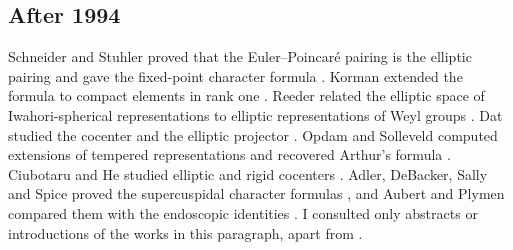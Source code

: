 \documentclass[12pt,letterpaper]{amsart}
\numberwithin{equation}{section}
\theoremstyle{definition}
\theoremstyle{remark}
\begin{document}
\subsection*{After 1994}
Schneider and Stuhler proved that the Euler--Poincar\'e pairing is the elliptic pairing and gave the fixed-point character formula \cite{SS97}. Korman extended the formula to compact elements in rank one \cite{Ko04}. Reeder related the elliptic space of Iwahori-spherical representations to elliptic representations of Weyl groups \cite{Re01}. Dat studied the cocenter and the elliptic projector \cite{Da00}. Opdam and Solleveld computed extensions of tempered representations and recovered Arthur's formula \cite{OS13}. Ciubotaru and He studied elliptic and rigid cocenters \cite{CH17,CH21}. Adler, DeBacker, Sally and Spice proved the supercuspidal character formulas \cite{ADSS11}, and Aubert and Plymen compared them with the endoscopic identities \cite{AP24}. I consulted only abstracts or introductions of the works in this paragraph, apart from \cite{Ko04}.
\end{document}
